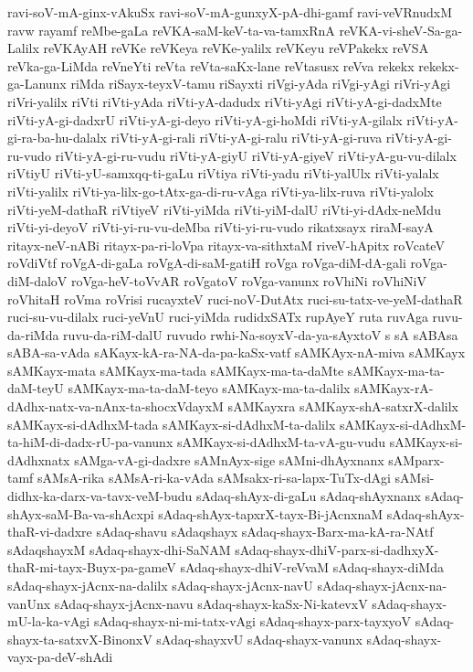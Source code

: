 {ravi-soV-mA-ginx-vAkuSx
ravi-soV-mA-gunxyX-pA-dhi-gamf
ravi-veVRnudxM
ravw
rayamf
reMbe-gaLa
reVKA-saM-keV-ta-va-tamxRnA
reVKA-vi-sheV-Sa-ga-Lalilx
reVKAyAH
reVKe
reVKeya
reVKe-yalilx
reVKeyu
reVPakekx
reVSA
reVka-ga-LiMda
reVneYti
reVta
reVta-saKx-lane
reVtasusx
reVva
rekekx
rekekx-ga-Lanunx
riMda
riSayx-teyxV-tamu
riSayxti
riVgi-yAda
riVgi-yAgi
riVri-yAgi
riVri-yalilx
riVti
riVti-yAda
riVti-yA-dadudx
riVti-yAgi
riVti-yA-gi-dadxMte
riVti-yA-gi-dadxrU
riVti-yA-gi-deyo
riVti-yA-gi-hoMdi
riVti-yA-gilalx
riVti-yA-gi-ra-ba-hu-dalalx
riVti-yA-gi-rali
riVti-yA-gi-ralu
riVti-yA-gi-ruva
riVti-yA-gi-ru-vudo
riVti-yA-gi-ru-vudu
riVti-yA-giyU
riVti-yA-giyeV
riVti-yA-gu-vu-dilalx
riVtiyU
riVti-yU-samxqq-ti-gaLu
riVtiya
riVti-yadu
riVti-yalUlx
riVti-yalalx
riVti-yalilx
riVti-ya-lilx-go-tAtx-ga-di-ru-vAga
riVti-ya-lilx-ruva
riVti-yalolx
riVti-yeM-dathaR
riVtiyeV
riVti-yiMda
riVti-yiM-dalU
riVti-yi-dAdx-neMdu
riVti-yi-deyoV
riVti-yi-ru-vu-deMba
riVti-yi-ru-vudo
rikatxsayx
riraM-sayA
ritayx-neV-nABi
ritayx-pa-ri-loVpa
ritayx-va-sithxtaM
riveV-hApitx
roVcateV
roVdiVtf
roVgA-di-gaLa
roVgA-di-saM-gatiH
roVga
roVga-diM-dA-gali
roVga-diM-daloV
roVga-heV-toVvAR
roVgatoV
roVga-vanunx
roVhiNi
roVhiNiV
roVhitaH
roVma
roVrisi
rucayxteV
ruci-noV-DutAtx
ruci-su-tatx-ve-yeM-dathaR
ruci-su-vu-dilalx
ruci-yeVnU
ruci-yiMda
rudidxSATx
rupAyeY
ruta
ruvAga
ruvu-da-riMda
ruvu-da-riM-dalU
ruvudo
rwhi-Na-soyxV-da-ya-sAyxtoV
s
sA
sABAsa
sABA-sa-vAda
sAKayx-kA-ra-NA-da-pa-kaSx-vatf
sAMKAyx-nA-miva
sAMKayx
sAMKayx-mata
sAMKayx-ma-tada
sAMKayx-ma-ta-daMte
sAMKayx-ma-ta-daM-teyU
sAMKayx-ma-ta-daM-teyo
sAMKayx-ma-ta-dalilx
sAMKayx-rA-dAdhx-natx-va-nAnx-ta-shocxVdayxM
sAMKayxra
sAMKayx-shA-satxrX-dalilx
sAMKayx-si-dAdhxM-tada
sAMKayx-si-dAdhxM-ta-dalilx
sAMKayx-si-dAdhxM-ta-hiM-di-dadx-rU-pa-vanunx
sAMKayx-si-dAdhxM-ta-vA-gu-vudu
sAMKayx-si-dAdhxnatx
sAMga-vA-gi-dadxre
sAMnAyx-sige
sAMni-dhAyxnanx
sAMparx-tamf
sAMsA-rika
sAMsA-ri-ka-vAda
sAMsakx-ri-sa-lapx-TuTx-dAgi
sAMsi-didhx-ka-darx-va-tavx-veM-budu
sAdaq-shAyx-di-gaLu
sAdaq-shAyxnanx
sAdaq-shAyx-saM-Ba-va-shAcxpi
sAdaq-shAyx-tapxrX-tayx-Bi-jAcnxnaM
sAdaq-shAyx-thaR-vi-dadxre
sAdaq-shavu
sAdaqshayx
sAdaq-shayx-Barx-ma-kA-ra-NAtf
sAdaqshayxM
sAdaq-shayx-dhi-SaNAM
sAdaq-shayx-dhiV-parx-si-dadhxyX-thaR-mi-tayx-Buyx-pa-gameV
sAdaq-shayx-dhiV-reVvaM
sAdaq-shayx-diMda
sAdaq-shayx-jAcnx-na-dalilx
sAdaq-shayx-jAcnx-navU
sAdaq-shayx-jAcnx-na-vanUnx
sAdaq-shayx-jAcnx-navu
sAdaq-shayx-kaSx-Ni-katevxV
sAdaq-shayx-mU-la-ka-vAgi
sAdaq-shayx-ni-mi-tatx-vAgi
sAdaq-shayx-parx-tayxyoV
sAdaq-shayx-ta-satxvX-BinonxV
sAdaq-shayxvU
sAdaq-shayx-vanunx
sAdaq-shayx-vayx-pa-deV-shAdi
}
